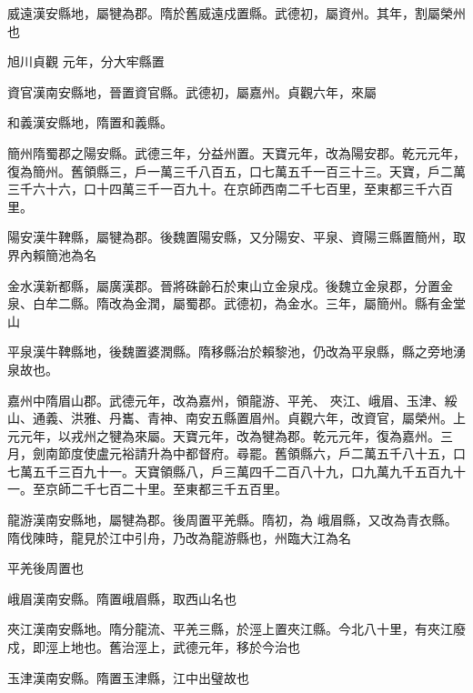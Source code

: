 \begin{pinyinscope}
 威遠漢安縣地，屬犍為郡。隋於舊威遠戍置縣。武德初，屬資州。其年，割屬榮州也



 旭川貞觀
 元年，分大牢縣置



 資官漢南安縣地，晉置資官縣。武德初，屬嘉州。貞觀六年，來屬



 和義漢安縣地，隋置和義縣。



 簡州隋蜀郡之陽安縣。武德三年，分益州置。天寶元年，改為陽安郡。乾元元年，復為簡州。舊領縣三，戶一萬三千八百五，口七萬五千一百三十三。天寶，戶二萬三千六十六，口十四萬三千一百九十。在京師西南二千七百里，至東都三千六百里。



 陽安漢牛鞞縣，屬犍為郡。後魏置陽安縣，又分陽安、平泉、資陽三縣置簡州，取界內賴簡池為名



 金水漢新都縣，屬廣漢郡。晉將硃齡石於東山立金泉戍。後魏立金泉郡，分置金泉、白牟二縣。隋改為金潤，屬蜀郡。武德初，為金水。三年，屬簡州。縣有金堂山



 平泉漢牛鞞縣地，後魏置婆潤縣。隋移縣治於賴黎池，仍改為平泉縣，縣之旁地湧泉故也。



 嘉州中隋眉山郡。武德元年，改為嘉州，領龍游、平羌、
 夾江、峨眉、玉津、綏山、通義、洪雅、丹巂、青神、南安五縣置眉州。貞觀六年，改資官，屬榮州。上元元年，以戎州之犍為來屬。天寶元年，改為犍為郡。乾元元年，復為嘉州。三月，劍南節度使盧元裕請升為中都督府。尋罷。舊領縣六，戶二萬五千八十五，口七萬五千三百九十一。天寶領縣八，戶三萬四千二百八十九，口九萬九千五百九十一。至京師二千七百二十里。至東都三千五百里。



 龍游漢南安縣地，屬犍為郡。後周置平羌縣。隋初，為
 峨眉縣，又改為青衣縣。隋伐陳時，龍見於江中引舟，乃改為龍游縣也，州臨大江為名



 平羌後周置也



 峨眉漢南安縣。隋置峨眉縣，取西山名也



 夾江漢南安縣地。隋分龍流、平羌三縣，於涇上置夾江縣。今北八十里，有夾江廢戍，即涇上地也。舊治涇上，武德元年，移於今治也



 玉津漢南安縣。隋置玉津縣，江中出璧故也




\end{pinyinscope}
